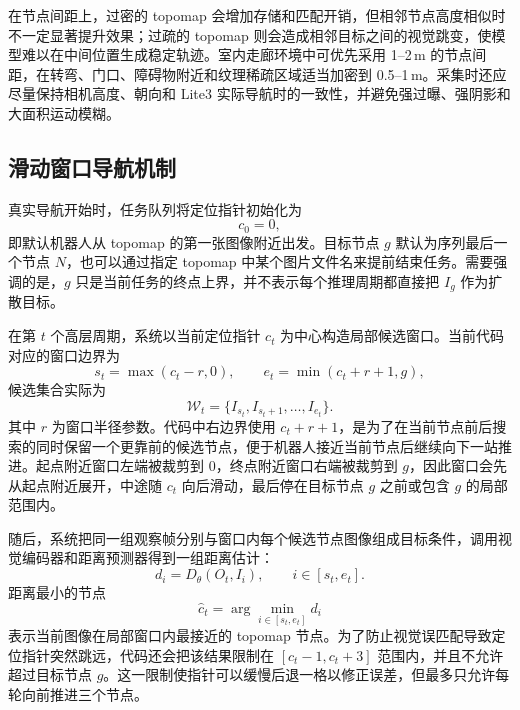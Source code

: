 在节点间距上，过密的 topomap 会增加存储和匹配开销，但相邻节点高度相似时不一定显著提升效果；过疏的 topomap 则会造成相邻目标之间的视觉跳变，使模型难以在中间位置生成稳定轨迹。室内走廊环境中可优先采用 1--2\,m 的节点间距，在转弯、门口、障碍物附近和纹理稀疏区域适当加密到 0.5--1\,m。采集时还应尽量保持相机高度、朝向和 Lite3 实际导航时的一致性，并避免强过曝、强阴影和大面积运动模糊。

\subsection{滑动窗口导航机制}

真实导航开始时，任务队列将定位指针初始化为
\begin{equation}
c_0=0,
\end{equation}
即默认机器人从 topomap 的第一张图像附近出发。目标节点 $g$ 默认为序列最后一个节点 $N$，也可以通过指定 topomap 中某个图片文件名来提前结束任务。需要强调的是，$g$ 只是当前任务的终点上界，并不表示每个推理周期都直接把 $I_g$ 作为扩散目标。

在第 $t$ 个高层周期，系统以当前定位指针 $c_t$ 为中心构造局部候选窗口。当前代码对应的窗口边界为
\begin{equation}
s_t=\max(c_t-r,0),\qquad e_t=\min(c_t+r+1,g),
\end{equation}
候选集合实际为
\begin{equation}
\mathcal{W}_t=\{I_{s_t},I_{s_t+1},\ldots,I_{e_t}\}.
\end{equation}
其中 $r$ 为窗口半径参数。代码中右边界使用 $c_t+r+1$，是为了在当前节点前后搜索的同时保留一个更靠前的候选节点，便于机器人接近当前节点后继续向下一站推进。起点附近窗口左端被裁剪到 0，终点附近窗口右端被裁剪到 $g$，因此窗口会先从起点附近展开，中途随 $c_t$ 向后滑动，最后停在目标节点 $g$ 之前或包含 $g$ 的局部范围内。

随后，系统把同一组观察帧分别与窗口内每个候选节点图像组成目标条件，调用视觉编码器和距离预测器得到一组距离估计：
\begin{equation}
d_i = D_\theta(O_t, I_i),\qquad i\in[s_t,e_t].
\end{equation}
距离最小的节点
\begin{equation}
\hat{c}_t=\arg\min_{i\in[s_t,e_t]}d_i
\end{equation}
表示当前图像在局部窗口内最接近的 topomap 节点。为了防止视觉误匹配导致定位指针突然跳远，代码还会把该结果限制在 $[c_t-1,c_t+3]$ 范围内，并且不允许超过目标节点 $g$。这一限制使指针可以缓慢后退一格以修正误差，但最多只允许每轮向前推进三个节点。

